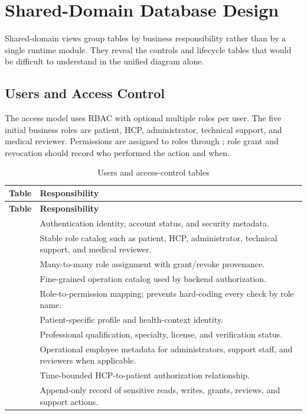 \section{Shared-Domain Database Design}\label{sec:shared-domain-design}

Shared-domain views group tables by business responsibility rather than by a single runtime module. They reveal the controls and lifecycle tables that would be difficult to understand in the unified diagram alone.

\subsection{Users and Access Control}

The access model uses RBAC with optional multiple roles per user. The five initial business roles are patient, HCP, administrator, technical support, and medical reviewer. Permissions are assigned to roles through ; role grant and revocation should record who performed the action and when.


\begin{longtable}{L{4.5cm}L{10.8cm}}
\caption{Users and access-control tables}\label{tab:access-tables}\\
\toprule
\textbf{Table} & \textbf{Responsibility}\\
\midrule
\endfirsthead
\toprule
\textbf{Table} & \textbf{Responsibility}\\
\midrule
\endhead
{} & Authentication identity, account status, and security metadata.\\
 & Stable role catalog such as patient, HCP, administrator, technical support, and medical reviewer.\\
 & Many-to-many role assignment with grant/revoke provenance.\\
 & Fine-grained operation catalog used by backend authorization.\\
 & Role-to-permission mapping; prevents hard-coding every check by role name.\\
 & Patient-specific profile and health-context identity.\\
 & Professional qualification, specialty, license, and verification status.\\
 & Operational employee metadata for administrators, support staff, and reviewers when applicable.\\
 & Time-bounded HCP-to-patient authorization relationship.\\
 & Append-only record of sensitive reads, writes, grants, reviews, and support actions.\\
\bottomrule
\end{longtable}

